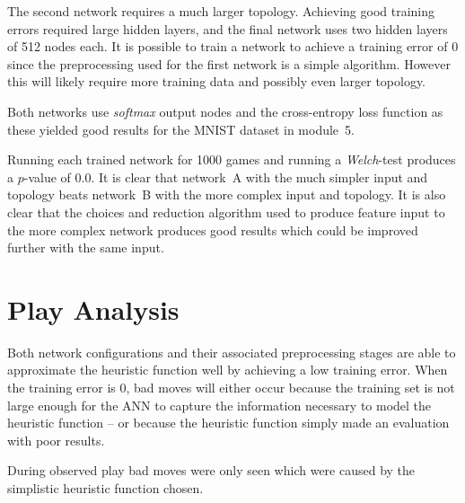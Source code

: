 The second network requires a much larger topology. Achieving good training errors required large hidden layers, and the final network uses two hidden layers of 512 nodes each. It is possible to train a network to achieve a training error of 0 since the preprocessing used for the first network is a simple algorithm. However this will likely require more training data and possibly even larger topology.

Both networks use \textit{softmax} output nodes and the cross-entropy loss function as these yielded good results for the MNIST dataset in module~5.

Running each trained network for 1000 games and running a \textit{Welch}-test produces a $p$-value of 0.0. It is clear that network~A with the much simpler input and topology beats network~B with the more complex input and topology. It is also clear that the choices and reduction algorithm used to produce feature input to the more complex network produces good results which could be improved further with the same input.

\section*{Play Analysis}

Both network configurations and their associated preprocessing stages are able to approximate the heuristic function well by achieving a low training error. When the training error is 0, bad moves will either occur because the training set is not large enough for the \ac{ANN} to capture the information necessary to model the heuristic function -- or because the heuristic function simply made an evaluation with poor results.

During observed play bad moves were only seen which were caused by the simplistic heuristic function chosen.

